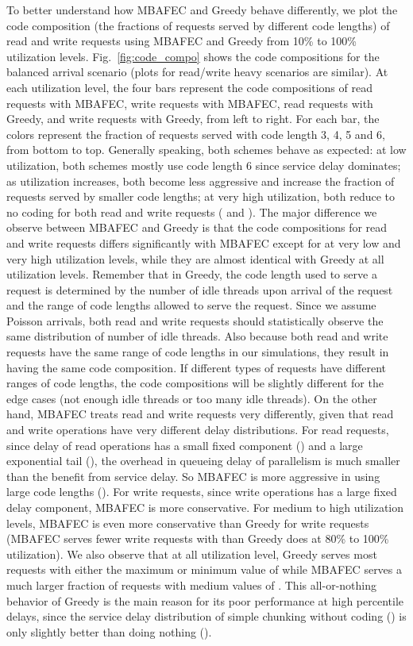 \documentclass[journal]{IEEEtran}
\newcommand{\multiclass}{{MBAFEC}\xspace}
\begin{document}
To better understand how \multiclass and Greedy behave differently, we plot the code composition (the fractions of requests served by different code lengths) of read and write requests using \multiclass and Greedy from 10\% to 100\% utilization levels. Fig.~\ref{fig:code_compo} shows the code compositions for the balanced arrival scenario (plots for read/write heavy scenarios are similar). At each utilization level, the four bars represent the code compositions of read requests with \multiclass, write requests with \multiclass, read requests with Greedy, and write requests with Greedy, from left to right. For each bar, the colors represent the fraction of requests served with code length 3, 4, 5 and 6, from bottom to top. Generally speaking, both schemes behave as expected: at low utilization, both schemes mostly use code length 6 since service delay dominates;  as utilization increases, both become less aggressive and increase the fraction of requests served by smaller code lengths; at very high utilization, both reduce to no coding for both read and write requests ( and ). The major difference we observe between \multiclass and Greedy is that the code compositions for read and write requests differs significantly with \multiclass except for at very low and very high utilization levels, while they are almost identical with Greedy at all utilization levels. Remember that in Greedy, the code length used to serve a request is determined by the number of idle threads upon arrival of the request and the range of code lengths allowed to serve the request. Since we assume Poisson arrivals, both read and write requests should statistically observe the same distribution of number of idle threads. Also because both read and write requests have the same range of code lengths in our simulations, they result in having the same code composition. If different types of requests have different ranges of code lengths, the code compositions will be slightly different for the edge cases (not enough idle threads or too many idle threads). On the other hand, \multiclass treats read and write requests very differently, given that read and write operations have very different delay distributions. For read requests, since delay of read operations has a small fixed component () and a large exponential tail (), the overhead in queueing delay of parallelism is much smaller than the benefit from service delay. So \multiclass is more aggressive in using large code lengths (). For write requests, since write operations has a large fixed delay component, \multiclass is more conservative. For medium to high utilization levels, \multiclass is even more conservative than Greedy for write requests (\multiclass serves fewer write requests with  than Greedy does at 80\% to 100\% utilization). 
We also observe that at all utilization level, Greedy serves most  requests with either the maximum or minimum value of  while \multiclass serves a much larger fraction of requests with medium values of . This all-or-nothing behavior of Greedy is the main reason for its poor performance at high percentile delays, since the service delay distribution of simple chunking without coding () is only slightly better than doing nothing ().
\end{document}
